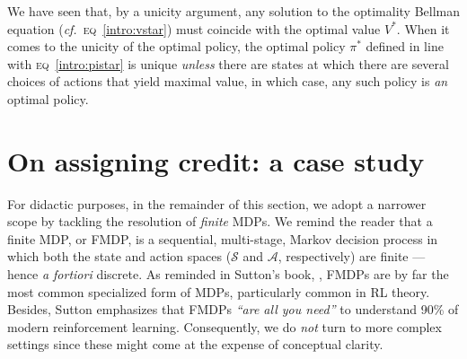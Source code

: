 We have seen that, by a unicity argument,
any solution to the optimality Bellman equation (\textit{cf.}~\textsc{eq}~\ref{intro:vstar})
must coincide with the optimal value $V^*$.
When it comes to the unicity of the optimal policy,
the optimal policy $\pi^*$ defined in line with \textsc{eq}~\ref{intro:pistar}
is unique \emph{unless} there are states at which there are
several choices of actions that yield maximal value, in which case, any such policy
is \emph{an} optimal policy.

\section{On assigning credit: a case study}

For didactic purposes, in the remainder of this section, we adopt a narrower scope by tackling the resolution
of \emph{finite} MDPs. We remind the reader that a finite MDP, or FMDP, is a sequential,
multi-stage, Markov decision process in which both the state and action spaces
($\mathcal{S}$ and $\mathcal{A}$, respectively) are finite --- hence \textit{a fortiori} discrete.
As reminded in Sutton's book, \cite{Sutton1998-ow}, FMDPs are by far the most common specialized form of MDPs,
particularly common in RL theory.
Besides, Sutton emphasizes that FMDPs \textit{``are all you need''} to understand 90\% of modern reinforcement learning.
Consequently, we do \emph{not} turn to more complex settings
since these might come at the expense of conceptual clarity.

